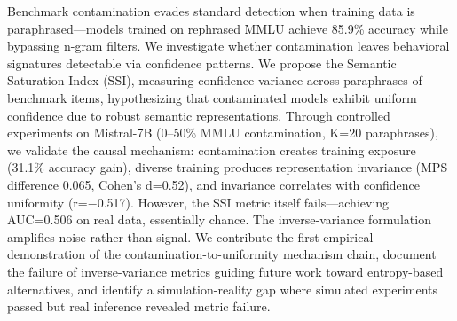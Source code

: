 Benchmark contamination evades standard detection when training data is paraphrased---models trained on rephrased MMLU achieve 85.9\% accuracy while bypassing n-gram filters. We investigate whether contamination leaves behavioral signatures detectable via confidence patterns. We propose the Semantic Saturation Index (SSI), measuring confidence variance across paraphrases of benchmark items, hypothesizing that contaminated models exhibit uniform confidence due to robust semantic representations. Through controlled experiments on Mistral-7B (0--50\% MMLU contamination, K=20 paraphrases), we validate the causal mechanism: contamination creates training exposure (31.1\% accuracy gain), diverse training produces representation invariance (MPS difference 0.065, Cohen's d=0.52), and invariance correlates with confidence uniformity (r=$-$0.517). However, the SSI metric itself fails---achieving AUC=0.506 on real data, essentially chance. The inverse-variance formulation amplifies noise rather than signal. We contribute the first empirical demonstration of the contamination-to-uniformity mechanism chain, document the failure of inverse-variance metrics guiding future work toward entropy-based alternatives, and identify a simulation-reality gap where simulated experiments passed but real inference revealed metric failure.
